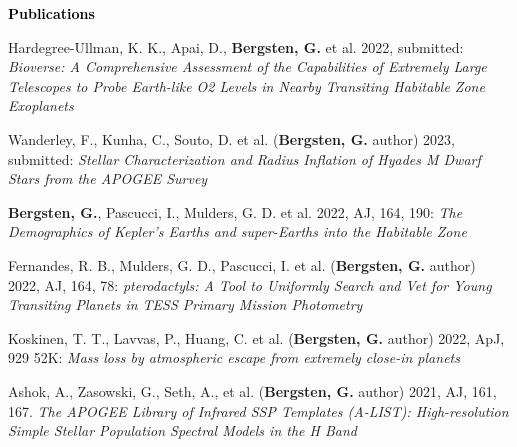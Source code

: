 \documentclass{resume} %
\newcommand{\mystrut}{\rule[-.3\baselineskip]{0pt}{\baselineskip}}
\renewenvironment{rSection}[1]{\mystrut{\textcolor{black}{{\large{\textbf{#1}}}}}
\vspace{-5pt} %
\begin{list}{}{
\setlength{\leftmargin}{0em}
}
\item[]
}{
\end{list}
}
\begin{document}
\begin{rSection}{Publications} \itemsep -2pt
\begin{etaremune}[nosep]


\item{Hardegree-Ullman, K. K., Apai, D., \textbf{Bergsten, G.} et al. 2022, submitted: \textit{Bioverse: A Comprehensive Assessment of the Capabilities of Extremely Large Telescopes to Probe Earth-like O2 Levels in Nearby Transiting Habitable Zone Exoplanets}}\vspace{-7pt}

\item{Wanderley, F., Kunha, C., Souto, D. et al. (\textbf{Bergsten, G.}  author) 2023, submitted: \textit{Stellar Characterization and Radius Inflation of Hyades M Dwarf Stars from the APOGEE Survey}}\vspace{-7pt}

\item{\textbf{Bergsten, G.}, Pascucci, I., Mulders, G. D. et al. 2022, AJ, 164, 190: \textit{The Demographics of Kepler's Earths and super-Earths into the Habitable Zone}}\vspace{-7pt}

\item{Fernandes, R. B., Mulders, G. D., Pascucci, I. et al. (\textbf{Bergsten, G.}  author) 2022, AJ, 164, 78: \textit{pterodactyls: A Tool to Uniformly Search and Vet for Young Transiting Planets in TESS Primary Mission Photometry}}\vspace{-7pt}

\item{Koskinen, T. T., Lavvas, P., Huang, C. et al. (\textbf{Bergsten, G.}  author) 2022, ApJ, 929 52K: \textit{Mass loss by atmospheric escape from extremely close-in planets}}\vspace{-7pt}

\item{Ashok, A., Zasowski, G., Seth, A., et al. (\textbf{Bergsten, G.}  author) 2021, AJ, 161, 167. \textit{The APOGEE Library of Infrared SSP Templates (A-LIST): High-resolution Simple Stellar Population Spectral Models in the H Band}}

\end{etaremune}
\end{rSection}
\vspace{5pt}\hline
\vspace{0pt}
\end{document}
